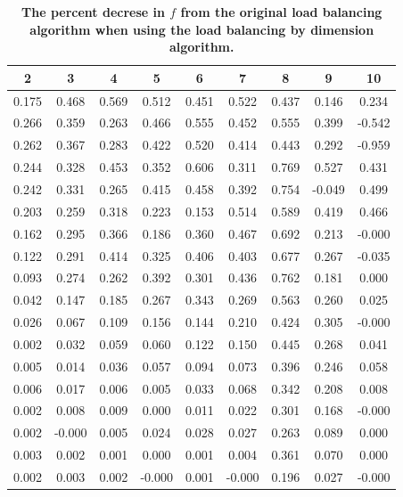 \documentclass[letterpaper]{mandc2019}
\begin{document}
{\begin{table}[htb]
\begin{tabular}{c|c|c|c|c|c|c|c|c}
  \end{tabular}
\end{table}

\begin{table}[htb]
\centering
  \caption{\bf The percent decrese in $f$ from the original load balancing algorithm when using the load balancing by dimension algorithm.}
  \begin{tabular}{c|c|c|c|c|c|c|c|c} 
\bf 2 &  \bf 3    & \bf  4   &  \bf  5   & \bf  6    &  \bf  7   &  \bf  8   &  \bf 9  &  \bf 10   \\ \hline \hline
0.175 & 0.468 & 0.569 & 0.512 & 0.451 & 0.522 & 0.437 & 0.146 & 0.234 \\  \hline 
0.266 & 0.359 & 0.263 & 0.466 & 0.555 & 0.452 & 0.555 & 0.399 & -0.542 \\ \hline 
0.262 & 0.367 & 0.283 & 0.422 & 0.520 & 0.414 & 0.443 & 0.292 & -0.959 \\ \hline 
0.244 & 0.328 & 0.453 & 0.352 & 0.606 & 0.311 & 0.769 & 0.527 & 0.431 \\  \hline
0.242 & 0.331 & 0.265 & 0.415 & 0.458 & 0.392 & 0.754 & -0.049 & 0.499 \\ \hline 
0.203 & 0.259 & 0.318 & 0.223 & 0.153 & 0.514 & 0.589 & 0.419 & 0.466 \\  \hline
0.162 & 0.295 & 0.366 & 0.186 & 0.360 & 0.467 & 0.692 & 0.213 & -0.000 \\ \hline 
0.122 & 0.291 & 0.414 & 0.325 & 0.406 & 0.403 & 0.677 & 0.267 & -0.035 \\ \hline 
0.093 & 0.274 & 0.262 & 0.392 & 0.301 & 0.436 & 0.762 & 0.181 & 0.000 \\  \hline
0.042 & 0.147 & 0.185 & 0.267 & 0.343 & 0.269 & 0.563 & 0.260 & 0.025 \\  \hline
0.026 & 0.067 & 0.109 & 0.156 & 0.144 & 0.210 & 0.424 & 0.305 & -0.000 \\ \hline 
0.002 & 0.032 & 0.059 & 0.060 & 0.122 & 0.150 & 0.445 & 0.268 & 0.041 \\  \hline
0.005 & 0.014 & 0.036 & 0.057 & 0.094 & 0.073 & 0.396 & 0.246 & 0.058 \\  \hline
0.006 & 0.017 & 0.006 & 0.005 & 0.033 & 0.068 & 0.342 & 0.208 & 0.008 \\  \hline
0.002 & 0.008 & 0.009 & 0.000 & 0.011 & 0.022 & 0.301 & 0.168 & -0.000 \\ \hline 
0.002 & -0.000 & 0.005 & 0.024 & 0.028 & 0.027 & 0.263 & 0.089 & 0.000 \\ \hline 
0.003 & 0.002 & 0.001 & 0.000 & 0.001 & 0.004 & 0.361 & 0.070 & 0.000 \\  \hline
0.002 & 0.003 & 0.002 & -0.000 & 0.001 & -0.000 & 0.196 & 0.027 & -0.000 \\ \hline 


\end{tabular}
\end{table}}
\end{document}

